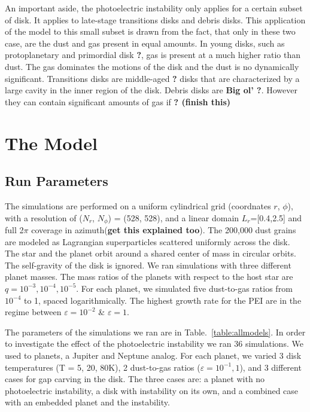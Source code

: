 \documentclass[onecolumn]{report}
\newcommand{\epsi}{\varepsilon}
\begin{document}
An important aside, the photoelectric instability only applies for a certain subset of disk. It applies to late-stage transitions disks and debris disks. This application of the model to this small subset is drawn from the fact, that only in these two case, are the dust and gas present in equal amounts. In young disks, such as protoplanetary and primordial disk \textbf{?}, gas is present at a much higher ratio than dust. The gas dominates the motions of the disk and the dust is no dynamically significant. Transitions disks are middle-aged \textbf{?} disks that are characterized by a large cavity in the inner region of the disk. Debris disks are \textbf{Big ol' ?}. However they can contain significant amounts of gas if \textbf{? (finish this)}

\section{The Model}

\subsection{Run Parameters}

The simulations are performed on a uniform cylindrical grid (coordnates $r$, $\phi$), with a resolution of ($N_r$, $N_{\phi}$) = (528, 528), and a linear domain $L_r$=[0.4,2.5] and full 2$\pi$ coverage in azimuth(\textbf{get this explained too}). The 200,000 dust grains are modeled as Lagrangian superparticles scattered uniformly across the disk. The star and the planet orbit around a shared center of mass in circular orbits. The self-gravity of the disk is ignored. We ran simulations with three different planet masses. The mass ratios of the planets with respect to the host star are $q = 10^{-3}, 10^{-4}, 10^{-5}$. For each planet, we simulated five dust-to-gas ratios from $10^{-4}$ to 1, spaced logarithmically. The highest growth rate for the PEI are in the regime between $\epsi=10^{-2}$ \& $\epsi=1$.

The parameters of the simulations we ran are in Table.~\ref{table:allmodels}. In order to investigate the effect of the photoelectric instability we ran 36 simulations. We used to planets, a Jupiter and Neptune analog. For each planet, we varied 3 disk temperatures (T = 5, 20, 80K), 2 dust-to-gas ratios ($\epsi=10^{-1},1$), and 3 different cases for gap carving in the disk. The three cases are: a planet with no photoelectric instability, a disk with instability on its own, and a combined case with an embedded planet and the instability.
\end{document}
